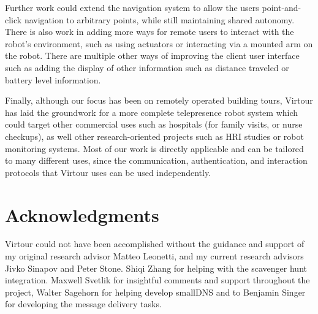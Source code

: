 \documentclass[
  oneside,
  11pt, a4paper,
  footinclude=true,
  headinclude=true,
  cleardoublepage=empty
]{article}
\begin{document}
Further work could extend the navigation system to allow the users
point-and-click navigation to arbitrary points, while still maintaining shared
autonomy. There is also work in adding more ways for remote users to interact
with the robot's environment, such as using actuators or interacting via a
mounted arm on the robot. There are multiple other ways of improving the client
user interface such as adding the display of other information such as distance
traveled or battery level information.

Finally, although our focus has been on remotely operated building tours,
Virtour has laid the groundwork for a more complete telepresence robot system
which could target other commercial uses such as hospitals (for family visits,
or nurse checkups), as well other research-oriented projects such as HRI
studies or robot monitoring systems. Most of our work is directly applicable
and can be tailored to many different uses, since the communication,
authentication, and interaction protocols that Virtour uses can be used
independently.

\section{Acknowledgments}\label{sec:acks}

Virtour could not have been accomplished without the guidance and support of my
original research advisor Matteo Leonetti, and my current research advisors
Jivko Sinapov and Peter Stone. Shiqi Zhang for helping with the scavenger hunt
integration. Maxwell Svetlik for insightful comments and support throughout the
project, Walter Sagehorn for helping develop smallDNS and to Benjamin Singer
for developing the message delivery tasks.



    
\end{document}

